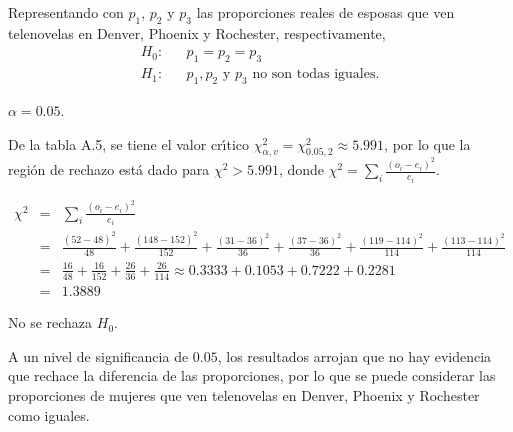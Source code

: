 \begin{solucion}
 \begin{hipotesis}
  Representando con $p_1$, $p_2$ y $p_3$ las proporciones reales de
  esposas que ven telenovelas en Denver, Phoenix y Rochester,
  respectivamente,
  \begin{eqnarray*}
   H_0: & & p_1 = p_2 = p_3 \\
   H_1: & & p_1, p_2 \text{ y } p_3 \text{ no son todas iguales.}
  \end{eqnarray*}
 \end{hipotesis}

 \begin{significancia}
  $\alpha = 0.05$.
 \end{significancia}

 \begin{region}
  De la tabla A.5, se tiene el valor cr\'{\i}tico
  $\chi^2_{\alpha,v} = \chi^2_{0.05,2} \approx 5.991$,
  por lo que la regi\'on de rechazo est\'a dado
  para $\chi^2 > 5.991$, donde
  $\chi^2 = \sum_{i} \frac{\left( o_i - e_i \right)^2}{e_i}$.
 \end{region}

 \begin{estadistico}
  \begin{eqnarray*}
   \chi^2 & = & \sum_{i} \frac{\left( o_i - e_i \right)^2}{e_i} \\
   & = & \frac{(52 - 48)^2}{48} + \frac{(148 - 152)^2}{152} +
   \frac{(31 - 36)^2}{36} + \frac{(37 - 36)^2}{36} + 
   \frac{(119 - 114)^2}{114} + \frac{(113 - 114)^2}{114} \\
   & = & \frac{16}{48}+\frac{16}{152}+\frac{26}{36}+\frac{26}{114}
   \approx 0.3333 + 0.1053 + 0.7222 + 0.2281 \\
   & = & 1.3889
  \end{eqnarray*}
 \end{estadistico}

 \begin{decision}
  No se rechaza $H_0$.
 \end{decision}

 \begin{conclusion}
  A un nivel de significancia de $0.05$, los resultados arrojan
  que no hay evidencia que rechace la diferencia de las proporciones,
  por lo que se puede considerar las proporciones de mujeres
  que ven telenovelas en Denver, Phoenix y Rochester como iguales.
 \end{conclusion}


\end{solucion}
